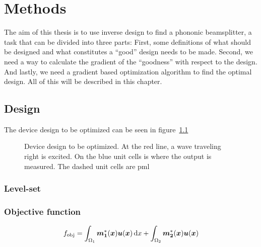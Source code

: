 \chapter{Methods}

The aim of this thesis is to use inverse design to find a phononic beamsplitter,
a task that can be divided into three parts: 
First, some definitions of what
should be designed and what constitutes a ``good'' design needs to be made.
Second, we need a way to calculate the gradient of the ``goodness'' with respect
to the design.
And lastly, we need a gradient based optimization algorithm to find the optimal
design.
All of this will be described in this chapter.

\section{Design}

The device design to be optimized can be seen in figure~\ref{fig:bs-design}

\begin{figure}[htpb]
	\centering
	
	\caption{
		Device design to be optimized.
		At the red line, a wave traveling right is excited.
		On the blue unit cells is where the output is measured.
		The dashed unit cells are \gls{pml}
	}
	\label{fig:bs-design}
\end{figure}


\subsection{Level-set}




\subsection{Objective function}

\begin{equation}
	\fobj = \int_{\Omega_1} \vec{m_1}^*(\vec{x}) \vec{u}(\vec{x})
	\dl{x} + \int_{\Omega_2} \vec{m_2}^*(\vec{x}) \vec{u}(\vec{x})
\end{equation}

